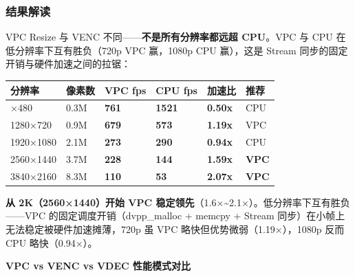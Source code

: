 \subsubsection{结果解读}\label{src-book-chapter6-h102}

VPC Resize 与 VENC 不同------\textbf{不是所有分辨率都远超 CPU}。VPC 与
CPU 在低分辨率下互有胜负（720p VPC 赢，1080p CPU 赢），这是 Stream
同步的固定开销与硬件加速之间的拉锯：

\begin{longtable}[]{@{}llllll@{}}
\toprule\noalign{}
分辨率 & 像素数 & VPC fps & CPU fps & 加速比 & 推荐 \\
\midrule\noalign{}
\endhead
\bottomrule\noalign{}
\endlastfoot
640×480 & 0.3M & \textbf{761} & \textbf{1521} & \textbf{0.50x} & CPU \\
1280×720 & 0.9M & \textbf{679} & \textbf{573} & \textbf{1.19x} & VPC \\
1920×1080 & 2.1M & \textbf{273} & \textbf{290} & \textbf{0.94x} & CPU \\
2560×1440 & 3.7M & \textbf{228} & \textbf{144} & \textbf{1.59x} &
\textbf{VPC} \\
3840×2160 & 8.3M & \textbf{110} & \textbf{53} & \textbf{2.07x} &
\textbf{VPC} \\
\end{longtable}

\textbf{从 2K（2560×1440）开始 VPC
稳定领先}（1.6×\textasciitilde2.1×）。低分辨率下互有胜负------VPC
的固定调度开销（dvpp\_malloc + memcpy + Stream
同步）在小帧上无法稳定被硬件加速摊薄，720p 虽 VPC
略快但优势微弱（1.19×），1080p 反而 CPU 略快（0.94×）。

\textbf{VPC vs VENC vs VDEC 性能模式对比}

